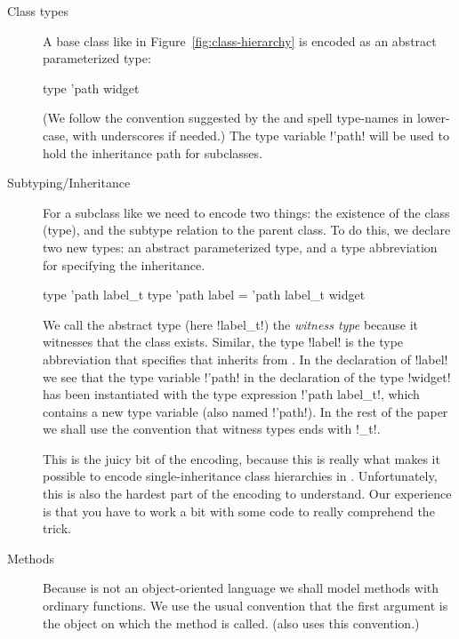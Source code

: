 \documentclass[finalversion]{usetex-v1}
\begin{document}
\begin{description}
\item[Class types] A base class like  in
  Figure~\ref{fig:class-hierarchy} is encoded as an abstract
  parameterized type:
\begin{SMLcode}
type 'path widget
\end{SMLcode}
(We follow the convention suggested by the \smlbasis and spell
type-names in lower-case, with underscores if needed.)  The type
variable !'path! will be used to hold the inheritance path for
subclasses.


\item[Subtyping/Inheritance] For a subclass like  we
  need to encode two things: the existence of the class
  (type), and the
  subtype relation to the parent class.  To do this, we declare two
  new \sml types: an abstract parameterized type, and a type
  abbreviation for specifying the inheritance.
\begin{SMLcode}
type 'path label_t
type 'path label = 
        'path label_t widget
\end{SMLcode}
We call the abstract type (here !label_t!) the \emph{witness type}
because it witnesses that the class exists.  Similar, the type !label!
is the type abbreviation that specifies that  inherits
from .  In the declaration of !label!  we see that
the type variable !'path! in the declaration of the type !widget!  has
been instantiated with the type expression !'path label_t!, which
contains a new type variable (also named !'path!).
In the rest of the paper we shall use the convention that witness
types ends with !_t!.

This is the juicy bit of the encoding, because this is really what
makes it possible to encode single-inheritance class hierarchies in
\sml.  Unfortunately, this is also the hardest part of the encoding to
understand.  Our experience is that you have to work a bit with some
code to really comprehend the trick.



\item[Methods] Because \sml is not an object-oriented language we shall
  model methods with ordinary functions. We use the usual convention
  that the first argument is the object on which the method is called.
  (\gtk also uses this convention.)
  

\end{description}
\end{document}

